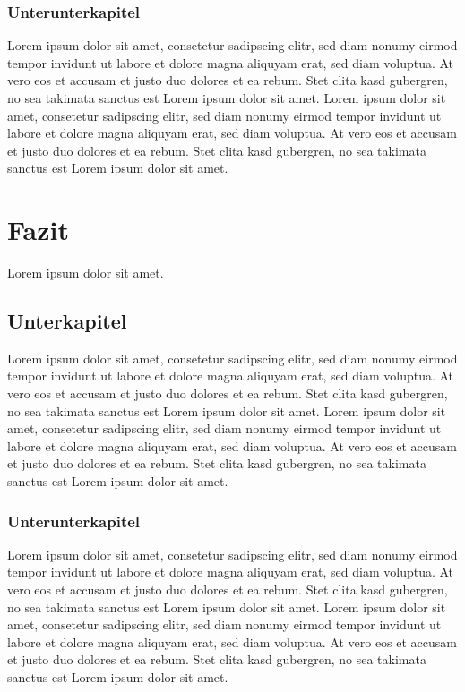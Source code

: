 \documentclass[a4paper,12pt,bibliography=totoc]{scrreprt}
\begin{document}
\subsection{Unterunterkapitel}
\label{subsec:uu2}
Lorem ipsum dolor sit amet, consetetur sadipscing elitr, sed diam nonumy eirmod tempor invidunt ut labore et dolore magna aliquyam erat, sed diam voluptua. At vero eos et accusam et justo duo dolores et ea rebum. Stet clita kasd gubergren, no sea takimata sanctus est Lorem ipsum dolor sit amet. Lorem ipsum dolor sit amet, consetetur sadipscing elitr, sed diam nonumy eirmod tempor invidunt ut labore et dolore magna aliquyam erat, sed diam voluptua. At vero eos et accusam et justo duo dolores et ea rebum. Stet clita kasd gubergren, no sea takimata sanctus est Lorem ipsum dolor sit amet.


\chapter{Fazit}
\label{chap:fazit}
Lorem ipsum dolor sit amet.

\section{Unterkapitel}
\label{sec:u5}
Lorem ipsum dolor sit amet, consetetur sadipscing elitr, sed diam nonumy eirmod tempor invidunt ut labore et dolore magna aliquyam erat, sed diam voluptua. At vero eos et accusam et justo duo dolores et ea rebum. Stet clita kasd gubergren, no sea takimata sanctus est Lorem ipsum dolor sit amet. Lorem ipsum dolor sit amet, consetetur sadipscing elitr, sed diam nonumy eirmod tempor invidunt ut labore et dolore magna aliquyam erat, sed diam voluptua. At vero eos et accusam et justo duo dolores et ea rebum. Stet clita kasd gubergren, no sea takimata sanctus est Lorem ipsum dolor sit amet.

\subsection{Unterunterkapitel}
\label{sec:uu3}
Lorem ipsum dolor sit amet, consetetur sadipscing elitr, sed diam nonumy eirmod tempor invidunt ut labore et dolore magna aliquyam erat, sed diam voluptua. At vero eos et accusam et justo duo dolores et ea rebum. Stet clita kasd gubergren, no sea takimata sanctus est Lorem ipsum dolor sit amet. Lorem ipsum dolor sit amet, consetetur sadipscing elitr, sed diam nonumy eirmod tempor invidunt ut labore et dolore magna aliquyam erat, sed diam voluptua. At vero eos et accusam et justo duo dolores et ea rebum. Stet clita kasd gubergren, no sea takimata sanctus est Lorem ipsum dolor sit amet.
\end{document}
